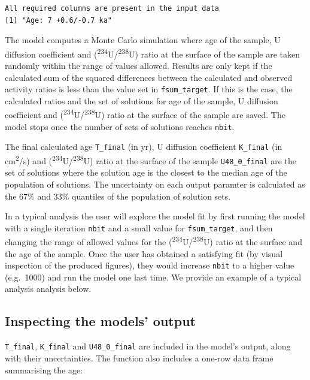 \documentclass[]{elsarticle} %
\begin{document}
\begin{verbatim}
All required columns are present in the input data
[1] "Age: 7 +0.6/-0.7 ka"
\end{verbatim}

The model computes a Monte Carlo simulation where age of the sample, U diffusion coefficient and (\textsuperscript{234}U/\textsuperscript{238}U) ratio at the surface of the sample are taken randomly within the range of values allowed. Results are only kept if the calculated sum of the squared differences between the calculated and observed activity ratios is less than the value set in \texttt{fsum\_target}. If this is the case, the calculated ratios and the set of solutions for age of the sample, U diffusion coefficient and (\textsuperscript{234}U/\textsuperscript{238}U) ratio at the surface of the sample are saved. The model stops once the number of sets of solutions reaches \texttt{nbit}.

The final calculated age \texttt{T\_final} (in yr), U diffusion coefficient \texttt{K\_final} (in cm\textsuperscript{2}/s) and (\textsuperscript{234}U/\textsuperscript{238}U) ratio at the surface of the sample \texttt{U48\_0\_final} are the set of solutions where the solution age is the closest to the median age of the population of solutions. The uncertainty on each output paramter is calculated as the 67\% and 33\% quantiles of the population of solution sets.

In a typical analysis the user will explore the model fit by first running the model with a single iteration \texttt{nbit} and a small value for \texttt{fsum\_target}, and then changing the range of allowed values for the (\textsuperscript{234}U/\textsuperscript{238}U) ratio at the surface and the age of the sample. Once the user has obtained a satisfying fit (by visual inspection of the produced figures), they would increase \texttt{nbit} to a higher value (e.g.~1000) and run the model one last time. We provide an example of a typical analysis analysis below.

\hypertarget{inspecting-the-models-output}{%
\subsection{Inspecting the models' output}\label{inspecting-the-models-output}}

\texttt{T\_final}, \texttt{K\_final} and \texttt{U48\_0\_final} are included in the model's output, along with their uncertainties. The function also includes a one-row data frame summarising the age:
\end{document}
